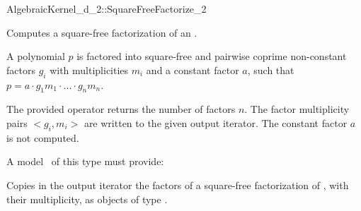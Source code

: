 \begin{ccRefFunctionObjectConcept}{AlgebraicKernel_d_2::SquareFreeFactorize_2}

\ccDefinition
Computes a square-free factorization of an
.

A polynomial $p$ is factored into square-free and pairwise 
coprime non-constant factors $g_i$ with multiplicities $m_i$ 
and a constant factor $a$, such that 
$p = a  \cdot  g_1m_1  \cdot  ...  \cdot  g_nm_n$.


The provided operator returns the number of factors $n$.
The factor multiplicity pairs $<g_i,m_i>$ are written to the 
given output iterator. The constant factor $a$ is not computed. 

\ccRefines 
{} 

\ccTypes
{}
\ccGlue
{}


\ccOperations
{}

A model \ccVar\ of this type must provide:

{Copies in the output iterator the factors of a square-free 
factorization of , with their multiplicity, as objects of type 
.}

\ccSeeAlso
{}\\
\\

\end{ccRefFunctionObjectConcept}
